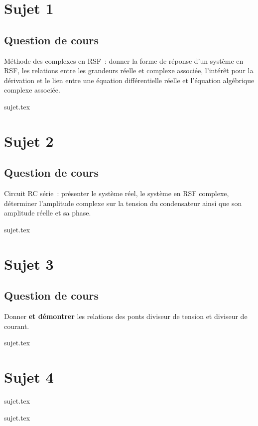 \documentclass[a4paper, 11pt]{book}
\begin{document}
\chapter{Sujet 1}
\section{Question de cours}

Méthode des complexes en RSF~: donner la forme de réponse d'un système en RSF,
les relations entre les grandeurs réelle et complexe associée, l'intérêt pour la
dérivation et le lien entre une équation différentielle réelle et l'équation
algébrique complexe associée.

\resetQ
{sujet.tex}

\chapter{Sujet 2}
\section{Question de cours}

Circuit RC série~: présenter le système réel, le système en RSF complexe,
déterminer l'amplitude complexe sur la tension du condensateur ainsi que son
amplitude réelle et sa phase.

\resetQ
{sujet.tex}

\chapter{Sujet 3}
\section{Question de cours}

Donner \textbf{et démontrer} les relations des ponts diviseur de tension et
diviseur de courant.

\resetQ
{sujet.tex}

\chapter{Sujet 4}

\resetQ
{sujet.tex}

\resetQ
{sujet.tex}
\end{document}
